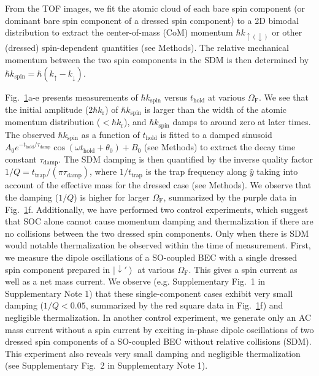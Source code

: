 \documentclass[showpacs,preprintnumbers,amsmath,amssymb, superscriptaddress, aps, reprint]{revtex4-1}
\def\k_r{k_{\text{r}}}
\def\OmegaF{\Omega_{\text{F}}}
\def\thold{t_{\text{hold}}}
\begin{document}
{\begin{figure}[t]
\label{Fig3}
\end{figure}
From the TOF images, we fit the atomic cloud of each bare spin component (or dominant bare spin component of a dressed spin component) to a 2D bimodal distribution to extract the center-of-mass (CoM) momentum $\hbar k_{\uparrow(\downarrow)}$ or other (dressed) spin-dependent quantities ({see Methods}). The relative mechanical momentum between the two spin components in the SDM is then determined by $\hbar {k_{\text{spin}}} = \hbar ({k_ \uparrow } - {k_ \downarrow })$.




Fig.~\ref{Fig3}a-e presents measurements of $\hbar {k_{\text{spin}}}$ versus $\thold$ at various $\OmegaF$. We see that the initial amplitude ($2 \hbar \k_r$) of $\hbar {k_{\text{spin}}}$ is larger than the width of the atomic momentum distribution ($< \hbar \k_r$), and $\hbar {k_{\text{spin}}}$ damps to around zero at later times. The observed $\hbar k_{\text{spin}}$ as a function of $\thold$ is fitted to a damped sinusoid ${A_0}e^{-\thold/\tau_{\text{damp}}}\cos (\omega {\thold} + {\theta _0}) + {B_0}$ ({see Methods}) to extract the decay time constant ${\tau_{\text{damp}}}$. The SDM damping is then quantified by the inverse quality factor $1/Q = {t_{\text{trap}}}/(\pi {\tau_{\text{damp}}})$, where $1/{t_{\text{trap}}}$ is the trap frequency along $\hat{y}$ taking into account of the effective mass for the dressed case ({see Methods}). We observe that the damping ($1/Q$) is higher for larger $\OmegaF$, summarized by the purple data in Fig.~\ref{Fig3}f. 
Additionally, we have performed two control experiments, which suggest that SOC alone cannot cause momentum damping and thermalization if there are no collisions between the two dressed spin components.
{Only when there is SDM would notable thermalization be observed within the time of measurement.}
First, we measure the dipole oscillations \cite{Lin_E_NP_2011,zhang_dipole_PRL_2012} of a SO-coupled BEC with a single dressed spin component prepared in $\left| {\downarrow '} \right\rangle$ at various $\OmegaF$. This gives a spin current as well as a net mass current. We observe (e.g. Supplementary Fig.~1 in Supplementary Note 1) that these single-component cases exhibit very small damping ($1/Q < 0.05$, summarized by the red square data in Fig.~\ref{Fig3}f) and negligible thermalization. In another control experiment, we generate only an AC mass current without a spin current by exciting in-phase dipole oscillations of two dressed spin components of a SO-coupled BEC without relative collisions (SDM). This experiment also reveals very small damping and negligible thermalization (see Supplementary Fig.~2 in Supplementary Note 1).


}
\end{document}
